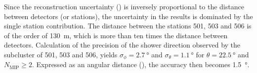 Since the reconstruction uncertainty () is
inversely proportional to the distance between detectors (or stations), the
uncertainty in the results is dominated by the single station contribution. The
distance between the stations 501, 503 and 506 is of the order of
\SI{130}{\meter}, which is more than ten times the distance between detectors.
Calculation of the precision of the shower direction observed by the subcluster
of 501, 503 and 506, yields $\sigma_\phi = \SI{2.7}{\degree}$ and $\sigma_\theta
= \SI{1.1}{\degree}$ for $\theta = \SI{22.5}{\degree}$ and $N_\mathrm{MIP} \geq
2$. Expressed as an angular distance (),
the accuracy then becomes \SI{1.5}{\degree}.
